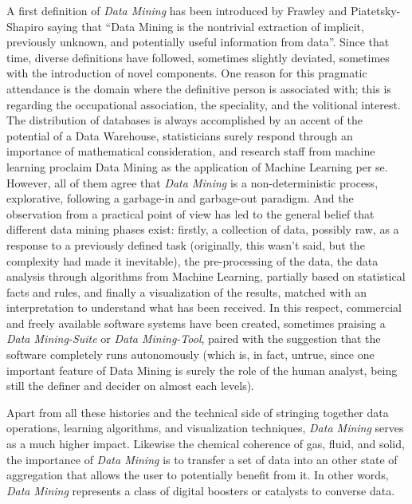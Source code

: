 \documentclass[10pt,latex8]{article}
\begin{document}
A first definition of \textit{Data Mining} has been introduced by Frawley and Piatetsky-Shapiro \cite{frawley} saying that ``Data Mining is the nontrivial extraction of implicit, previously unknown, and potentially useful information from data''. Since that time, diverse definitions have followed, sometimes slightly deviated, sometimes with the introduction of novel components. One reason for this pragmatic attendance is the domain where the definitive person is associated with; this is regarding the occupational association, the speciality, and the volitional interest. The distribution of databases is always accomplished by an accent of the potential of a Data Warehouse, statisticians surely respond through an importance of mathematical consideration, and research staff from machine learning proclaim Data Mining as the application of Machine Learning per se. However, all of them agree that \textit{Data Mining} is a non-deterministic process, explorative, following a garbage-in and garbage-out paradigm. And the observation from a practical point of view has led to the general belief that different data mining phases exist: firstly, a collection of data, possibly raw, as a response to a previously defined task (originally, this wasn't said, but the complexity had made it inevitable), the pre-processing of the data, the data analysis through algorithms from Machine Learning, partially based on statistical facts and rules, and finally a visualization of the results, matched with an interpretation to understand what has been received. In this respect, commercial and freely available software systems have been created, sometimes praising a \textit{Data Mining-Suite} or \textit{Data Mining-Tool}, paired with the suggestion that the software completely runs autonomously (which is, in fact, untrue, since one important feature of Data Mining is surely the role of the human analyst, being still the definer and decider on almost each levels).



Apart from all these histories and the technical side of stringing together data operations, learning algorithms, and visualization techniques, \textit{Data Mining} serves as a much higher impact. Likewise the chemical coherence of gas, fluid, and solid, the importance of \textit{Data Mining} is to transfer a set of data  into an other state of aggregation that allows the user to potentially benefit from it. In other words, \textit{Data Mining} represents a class of digital boosters or catalysts to converse data.
\end{document}
